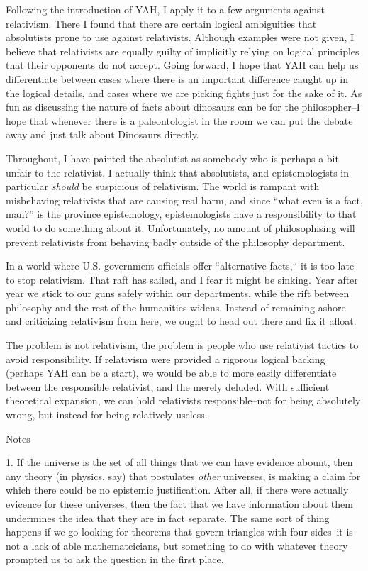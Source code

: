 \documentclass[12pt]{article}
\begin{document}
\begin{flushleft}
Following the introduction of YAH, I apply it to a few arguments against relativism.
There I found that there are certain logical ambiguities that absolutists prone to use against relativists.
Although examples were not given, I believe that relativists are equally guilty of implicitly relying on logical principles that their opponents do not accept.
Going forward, I hope that YAH can help us differentiate between cases where there is an important difference caught up in the logical details, and cases where we are picking fights just for the sake of it.
As fun as discussing the nature of facts about dinosaurs can be for the philosopher--I hope that whenever there is a paleontologist in the room we can put the debate away and just talk about Dinosaurs directly.

Throughout, I have painted the absolutist as somebody who is perhaps a bit unfair to the relativist.
I actually think that absolutists, and epistemologists in particular \textit{should} be suspicious of relativism.
The world is rampant with misbehaving relativists that are causing real harm, and since ``what even is a fact, man?'' is the province epistemology, epistemologists have a responsibility to that world to do something about it.
Unfortunately, no amount of philosophising will prevent relativists from behaving badly outside of the philosophy department.

In a world where U.S. government officials offer ``alternative facts,`` it is too late to stop relativism.
That raft has sailed, and I fear it might be sinking.
Year after year we stick to our guns safely within our departments, while the rift between philosophy and the rest of the humanities widens.
Instead of remaining ashore and criticizing relativism from here, we ought to head out there and fix it afloat.

The problem is not relativism, the problem is people who use relativist tactics to avoid responsibility.
If relativism were provided a rigorous logical backing (perhaps YAH can be a start), we would be able to more easily differentiate between the responsible relativist, and the merely deluded.
With sufficient theoretical expansion, we can hold relativists responsible--not for being absolutely wrong, but instead for being relatively useless.

\clearpage
\begin{center}
    Notes
\end{center}
\setlength{\parindent}{0.5in}

1. If the universe is the set of all things that we can have evidence abount, then any theory (in physics, say) that postulates \textit{other} universes, is making a claim for which there could be no epistemic justification.  After all, if there were actually evicence for these universes, then the fact that we have information about them undermines the idea that they are in fact separate.  The same sort of thing happens if we go looking for theorems that govern triangles with four sides--it is not a lack of able mathematcicians, but something to do with whatever theory prompted us to ask the question in the first place.


\end{flushleft}
\end{document}

